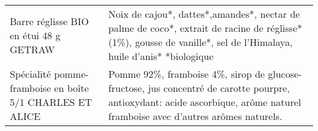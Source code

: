\begin{longtable}{p{5cm}p{10cm}}
                                                                   Barre réglisse BIO en étui 48 g GETRAW &                                                                                                                                                                                                                                                                                                                                                                                                                                                                                                                                                                                                                                                                                                                                                                                                                                                                        Noix de cajou*, dattes*,amandes*, nectar de palme de coco*, extrait de racine de réglisse* (1\%), gousse de vanille*, sel de l'Himalaya, huile d'anis* *biologique \\
                                                 Spécialité pomme-framboise en boîte 5/1 CHARLES ET ALICE &                                                                                                                                                                                                                                                                                                                                                                                                                                                                                                                                                                                                                                                                                                                                                                                                                                                              Pomme 92\%, framboise 4\%, sirop de glucose-fructose, jus concentré de carotte pourpre, antioxydant: acide ascorbique, arôme naturel framboise avec d'autres arômes naturels. \\

\end{longtable}
